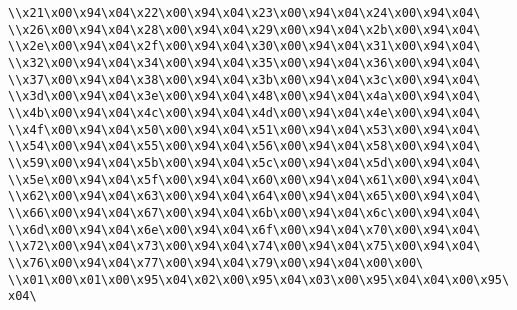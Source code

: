 \verb|\\x21\x00\x94\x04\x22\x00\x94\x04\x23\x00\x94\x04\x24\x00\x94\x04\|\newline
\verb|\\x26\x00\x94\x04\x28\x00\x94\x04\x29\x00\x94\x04\x2b\x00\x94\x04\|\newline
\verb|\\x2e\x00\x94\x04\x2f\x00\x94\x04\x30\x00\x94\x04\x31\x00\x94\x04\|\newline
\verb|\\x32\x00\x94\x04\x34\x00\x94\x04\x35\x00\x94\x04\x36\x00\x94\x04\|\newline
\verb|\\x37\x00\x94\x04\x38\x00\x94\x04\x3b\x00\x94\x04\x3c\x00\x94\x04\|\newline
\verb|\\x3d\x00\x94\x04\x3e\x00\x94\x04\x48\x00\x94\x04\x4a\x00\x94\x04\|\newline
\verb|\\x4b\x00\x94\x04\x4c\x00\x94\x04\x4d\x00\x94\x04\x4e\x00\x94\x04\|\newline
\verb|\\x4f\x00\x94\x04\x50\x00\x94\x04\x51\x00\x94\x04\x53\x00\x94\x04\|\newline
\verb|\\x54\x00\x94\x04\x55\x00\x94\x04\x56\x00\x94\x04\x58\x00\x94\x04\|\newline
\verb|\\x59\x00\x94\x04\x5b\x00\x94\x04\x5c\x00\x94\x04\x5d\x00\x94\x04\|\newline
\verb|\\x5e\x00\x94\x04\x5f\x00\x94\x04\x60\x00\x94\x04\x61\x00\x94\x04\|\newline
\verb|\\x62\x00\x94\x04\x63\x00\x94\x04\x64\x00\x94\x04\x65\x00\x94\x04\|\newline
\verb|\\x66\x00\x94\x04\x67\x00\x94\x04\x6b\x00\x94\x04\x6c\x00\x94\x04\|\newline
\verb|\\x6d\x00\x94\x04\x6e\x00\x94\x04\x6f\x00\x94\x04\x70\x00\x94\x04\|\newline
\verb|\\x72\x00\x94\x04\x73\x00\x94\x04\x74\x00\x94\x04\x75\x00\x94\x04\|\newline
\verb|\\x76\x00\x94\x04\x77\x00\x94\x04\x79\x00\x94\x04\x00\x00\|\newline
\verb|\\x01\x00\x01\x00\x95\x04\x02\x00\x95\x04\x03\x00\x95\x04\x04\x00\x95\x04\|\newline
